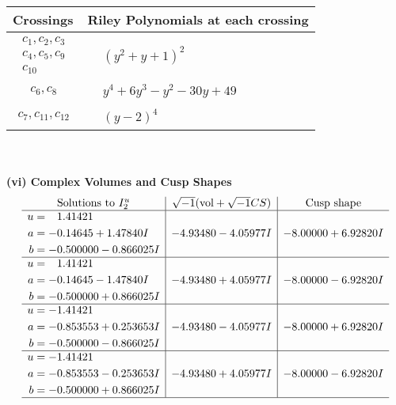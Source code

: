\documentclass[1p]{elsarticle_modified}
\theoremstyle{definition}
\newcommand{\I}{\sqrt{-1}}
\begin{document}
\begin{tabular}{m{50pt}|m{274pt}}
Crossings & \hspace{64pt}Riley Polynomials at each crossing \\
\hline $$\begin{aligned}c_{1},c_{2},c_{3}\\c_{4},c_{5},c_{9}\\c_{10}\end{aligned}$$&$\begin{aligned}
&(y^2+y+1)^2
\end{aligned}$\\
\hline $$\begin{aligned}c_{6},c_{8}\end{aligned}$$&$\begin{aligned}
&y^4+6 y^3- y^2-30 y+49
\end{aligned}$\\
\hline $$\begin{aligned}c_{7},c_{11},c_{12}\end{aligned}$$&$\begin{aligned}
&(y-2)^4
\end{aligned}$\\
\hline
\end{tabular}\\~\\
\newpage\flushleft \textbf{(vi) Complex Volumes and Cusp Shapes}
$$\begin{array}{c|c|c}  
\text{Solutions to }I^u_{2}& \I (\text{vol} + \sqrt{-1}CS) & \text{Cusp shape}\\
 \hline 
\begin{aligned}
u &= \phantom{-}1.41421\phantom{ +0.000000I} \\
a &= -0.14645 + 1.47840 I \\
b &= -0.500000 - 0.866025 I\end{aligned}
 & -4.93480 - 4.05977 I & -8.00000 + 6.92820 I \\ \hline\begin{aligned}
u &= \phantom{-}1.41421\phantom{ +0.000000I} \\
a &= -0.14645 - 1.47840 I \\
b &= -0.500000 + 0.866025 I\end{aligned}
 & -4.93480 + 4.05977 I & -8.00000 - 6.92820 I \\ \hline\begin{aligned}
u &= -1.41421\phantom{ +0.000000I} \\
a &= -0.853553 + 0.253653 I \\
b &= -0.500000 - 0.866025 I\end{aligned}
 & -4.93480 - 4.05977 I & -8.00000 + 6.92820 I \\ \hline\begin{aligned}
u &= -1.41421\phantom{ +0.000000I} \\
a &= -0.853553 - 0.253653 I \\
b &= -0.500000 + 0.866025 I\end{aligned}
 & -4.93480 + 4.05977 I & -8.00000 - 6.92820 I\\
 \hline 
 \end{array}$$\newpage\newpage\renewcommand{\arraystretch}{1}
\end{document}
